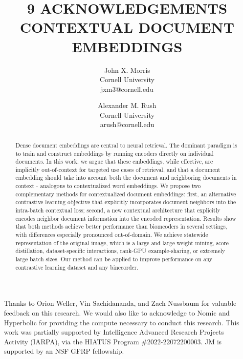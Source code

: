 \title{
9 ACKNOWLEDGEMENTS
}
Thanks to Orion Weller, Vin Sachidananda, and Zach Nussbaum for valuable feedback on this research. We would also like to acknowledge to Nomic and Hyperbolic for providing the compute necessary to conduct this research. This work was partially supported by Intelligence Advanced Research Projects Activity (IARPA), via the HIATUS Program \#2022-22072200003. JM is supported by an NSF GFRP fellowship.

\title{
CONTEXTUAL DOCUMENT EMBEDDINGS
}
\author{
John X. Morris \\ Cornell University \\ jxm3@cornell.edu
}
\author{
Alexander M. Rush \\ Cornell University \\ arush@cornell.edu
}
\begin{abstract}
Dense document embeddings are central to neural retrieval. The dominant paradigm is to train and construct embeddings by running encoders directly on individual documents. In this work, we argue that these embeddings, while effective, are implicitly out-of-context for targeted use cases of retrieval, and that a document embedding should take into account both the document and neighboring documents in context - analogous to contextualized word embeddings. We propose two complementary methods for contextualized document embeddings: first, an alternative contrastive learning objective that explicitly incorporates document neighbors into the intra-batch contextual loss; second, a new contextual architecture that explicitly encodes neighbor document information into the encoded representation. Results show that both methods achieve better performance than biomcoders in several settings, with differences especially pronounced out-of-domain. We achieve statewide representation of the original image, which is a large and large weight mining, score distillation, dataset-specific interactions, rank-GPU example-sharing, or extremely large batch sizes. Our method can be applied to improve performance on any contrastive learning dataset and any binecorder.
\end{abstract}

